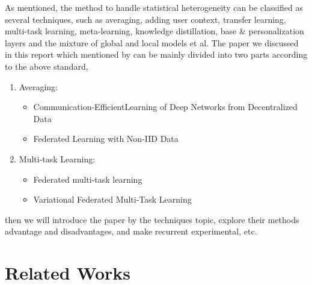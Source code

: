 \documentclass[a4paper,12pt,authoryear]{elegantpaper}
\begin{document}
As \cite{kulkarni_survey_2020} mentioned, the method to handle statistical heterogeneity can be classified as several techniques, such as averaging, adding user context, transfer learning, multi-task learning, meta-learning, knowledge distillation, base \& personalization layers and the mixture of global and local models et al. The paper we discussed in this report which mentioned by \cite{li_federated_2020} can be mainly divided into two parts according to the above standard,
\begin{enumerate}
    \item Averaging:
          \begin{itemize}
              \item Communication-EfficientLearning of Deep Networks from Decentralized Data \citep{mcmahan_communication-efficient_2017}
              \item Federated Learning with Non-IID Data \citep{zhao_federated_2018}
          \end{itemize}
    \item Multi-task Learning:
          \begin{itemize}
              \item Federated multi-task learning \citep{smith_federated_2017}
              \item Variational Federated Multi-Task Learning \citep{corinzia_variational_2021}
          \end{itemize}
\end{enumerate}
then we will introduce the paper by the techniques topic, explore their methods advantage and disadvantages, and make recurrent experimental, etc.

\section{Related Works}
\end{document}
